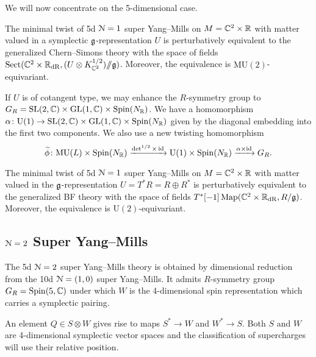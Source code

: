 \documentclass[10pt, oneside]{article}
\newcommand{\MU}{\mathrm{MU}}
\newcommand{\Sect}{\mathrm{Sect}}
\renewcommand{\U}{\mathrm{U}}
\newcommand{\ham}{/\!\!/}
\begin{document}
We will now concentrate on the 5-dimensional case.

\begin{theorem}
The minimal twist of 5d $\mathcal N=1$ super Yang--Mills on $M=\mathbb C^2\times \mathbb R$ with matter valued in a symplectic $\mathfrak g$-representation $U$ is perturbatively equivalent to the generalized Chern--Simons theory with the space of fields $\Sect(\CC^2\times \RR_{\mathrm{dR}}, (U\otimes K_{\CC^2}^{1/2})\ham \fg)$. Moreover, the equivalence is $\MU(2)$-equivariant.
\label{thm:5dminimaltwist}
\end{theorem}

If $U$ is of cotangent type, we may enhance the $R$-symmetry group to $G_R=\mathrm{SL}(2, \mathbb C)\times \mathrm{GL}(1, \mathbb C)\times \mathrm{Spin}(N_\mathbb R)$. We have a homomorphism $\alpha\colon \U(1)\rightarrow \SL(2, \CC)\times \GL(1, \CC)\times \Spin(N_\RR)$ given by the diagonal embedding into the first two components. We also use a new twisting homomorphism
\[\wt\phi\colon \MU(L)\times \Spin(N_\RR)\xrightarrow{\det^{1/2}\times \id}\U(1)\times \Spin(N_\RR)\xrightarrow{\alpha\times\id}G_R.\]

\begin{theorem}
The minimal twist of 5d $\mathcal N=1$ super Yang--Mills on $M=\mathbb C^2\times \mathbb R$ with matter valued in the $\mathfrak g$-representation $U=T^* R=R\oplus R^*$ is perturbatively equivalent to the generalized BF theory with the space of fields $T^*[-1]\operatorname{Map}(\mathbb C^2\times \mathbb R_{\mathrm{dR}}, R/\mathfrak g)$. Moreover, the equivalence is $\U(2)$-equivariant.
\label{thm:5dminimaltwistgraded}
\end{theorem}

\subsection{\texorpdfstring{$\mathcal{N} = 2$}{N=2} Super Yang--Mills} \label{5d_2_section}

The 5d $\mathcal N=2$ super Yang--Mills theory is obtained by dimensional reduction from the 10d $\mathcal N=(1, 0)$ super Yang--Mills. It admits $R$-symmetry group $G_R=\mathrm{Spin}(5, \mathbb C)$ under which $W$ is the 4-dimensional spin representation which carries a symplectic pairing.

An element $Q\in S\otimes W$ gives rise to maps $S^*\rightarrow W$ and $W^*\rightarrow S$. Both $S$ and $W$ are 4-dimensional symplectic vector spaces and the classification of supercharges will use their relative position.
\end{document}
